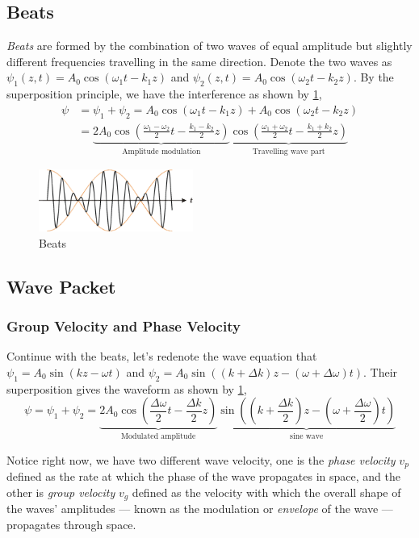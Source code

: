 \documentclass[UTF8]{book}
\begin{document}
\subsection{Beats}
\emph{Beats} are formed by the combination of two waves of equal amplitude but slightly different frequencies travelling in the same direction. Denote the two waves as $\psi _1(z,t)=A_0\cos (\omega _1t-k_1z)$ and $\psi _2(z,t)=A_0\cos (\omega _2t-k_2z)$. By the superposition principle, we have the interference as shown by \ref{fig:7},
\begin{align*}
\psi &=\psi_1+\psi _2=A_0\cos (\omega _1t-k_1z)+A_0\cos (\omega _2t-k_2z)\\
&=\underbrace{2A_0\cos \left(\frac{\omega _1-\omega _2}{2}t-\frac{k_1-k_2}{2}z\right)}_\text{Amplitude modulation}\underbrace{\cos \left(\frac{\omega _1+\omega _2}{2}t-\frac{k_1+k_2}{2}z\right)}_\text{Travelling wave part}
\end{align*}

\begin{figure}[H]
\centering
\includegraphics[width=0.45\textwidth]{Figure/7.PNG}
\caption{Beats}
\label{fig:7}
\end{figure}


\subsection{Wave Packet}
\subsubsection{Group Velocity and Phase Velocity}
Continue with the beats, let's redenote the wave equation that $\psi _1=A_0\sin (kz-\omega t)$ and $\psi _2=A_0\sin \left((k+\Delta k)z-(\omega +\Delta \omega)t\right)$. Their superposition gives the waveform as shown by \ref{fig:7},
\[\psi =\psi_1+\psi_2=\underbrace{2A_0\cos \left(\frac{\Delta \omega }{2}t-\frac{\Delta k}{2}z\right)}_\text{Modulated
amplitude}\underbrace{\sin \left((k+\frac{\Delta k}{2})z-(\omega +\frac{\Delta \omega }{2})t\right)}_\text{sine wave}\]

Notice right now, we have two different wave velocity, one is the \emph{phase velocity} $v_p$ defined as  the rate at which the phase of the wave propagates in space, and the other is \emph{group velocity} $v_g$ defined as the velocity with which the overall shape of the waves' amplitudes — known as the modulation or \emph{envelope} of the wave — propagates through space.
\end{document}
